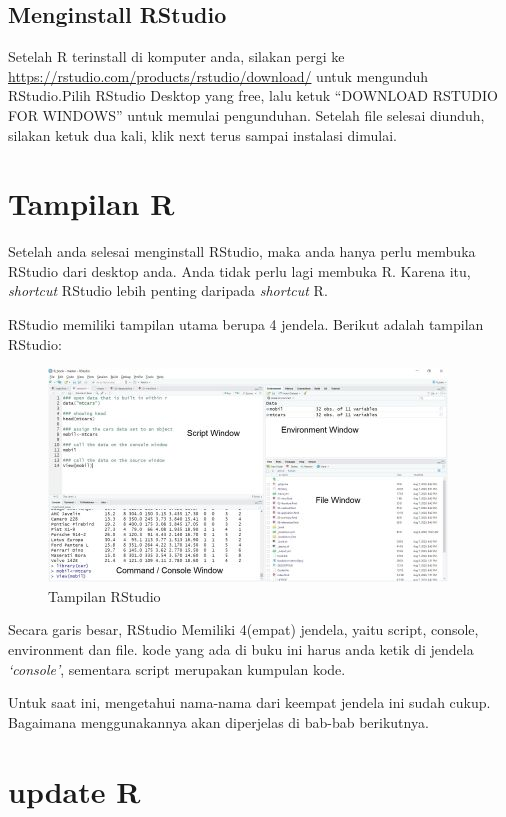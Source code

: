 \documentclass[
]{book}
\begin{document}
\hypertarget{menginstall-rstudio}{%
\subsection{Menginstall RStudio}\label{menginstall-rstudio}}

Setelah R terinstall di komputer anda, silakan pergi ke \url{https://rstudio.com/products/rstudio/download/} untuk mengunduh RStudio.Pilih RStudio Desktop yang free, lalu ketuk ``DOWNLOAD RSTUDIO FOR WINDOWS'' untuk memulai pengunduhan. Setelah file selesai diunduh, silakan ketuk dua kali, klik next terus sampai instalasi dimulai.

\hypertarget{tampilan-r}{%
\section{Tampilan R}\label{tampilan-r}}

Setelah anda selesai menginstall RStudio, maka anda hanya perlu membuka RStudio dari desktop anda. Anda tidak perlu lagi membuka R. Karena itu, \emph{shortcut} RStudio lebih penting daripada \emph{shortcut} R.

RStudio memiliki tampilan utama berupa 4 jendela. Berikut adalah tampilan RStudio:

\begin{figure}
\centering
\includegraphics{tampilanR2.JPG}
\caption{\label{fig:unnamed-chunk-1}Tampilan RStudio}
\end{figure}

Secara garis besar, RStudio Memiliki 4(empat) jendela, yaitu script, console, environment dan file. kode yang ada di buku ini harus anda ketik di jendela \emph{`console'}, sementara script merupakan kumpulan kode.

Untuk saat ini, mengetahui nama-nama dari keempat jendela ini sudah cukup. Bagaimana menggunakannya akan diperjelas di bab-bab berikutnya.

\hypertarget{update-r}{%
\section{update R}\label{update-r}}
\end{document}
